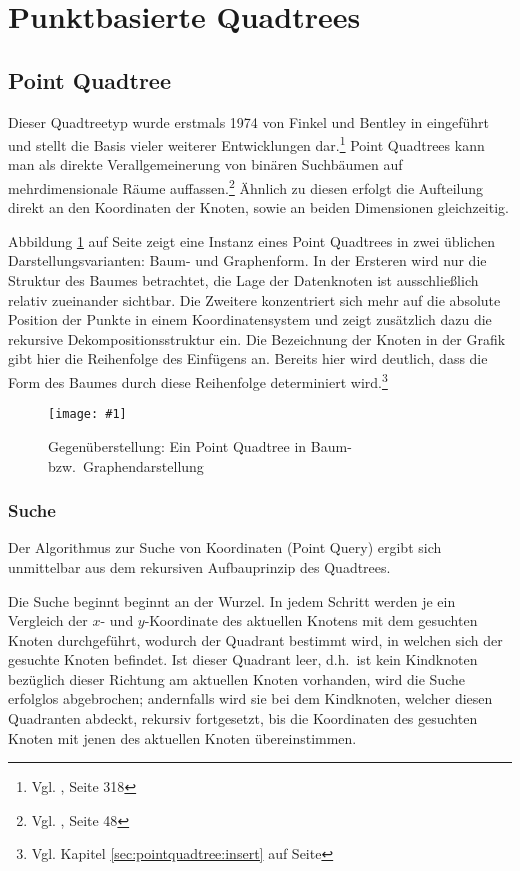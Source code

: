 \documentclass[%
			paper=a4,%
			DIV12,
			liststotoc,
			bibtotoc,
			draft=false,%
			titlepage
			]{scrartcl}
\newcommand{\zit}[3]{#1 \cite{#2}, #3}
\newcommand{\footzit}[3]{\footnote{\zit{#1}{#2}{#3}}}
\newcommand{\myfig}[5] {
 \begin{figure}[tbph]
	 \centering
	 \texttt{[image: \#1]}
	 \caption[#4]{#5}
	 \label{fig:#2}
 \end{figure}
}
\begin{document}
\section{Punktbasierte Quadtrees}
\label{sec:pointbased}
\subsection{Point Quadtree}
Dieser Quadtreetyp wurde erstmals 1974 von Finkel und Bentley in \cite{DBLP:journals/acta/FinkelB74} eingeführt und stellt die Basis vieler weiterer Entwicklungen dar.\footzit{Vgl.}{compgeom:2000}{Seite 318}
Point Quadtrees kann man als direkte Verallgemeinerung von binären Suchbäumen auf mehrdimensionale Räume auffassen.\footzit{Vgl.}{Samet90}{Seite 48}
Ähnlich zu diesen erfolgt die Aufteilung direkt an den Koordinaten der Knoten, sowie an beiden Dimensionen gleichzeitig. 


Abbildung \ref{fig:pointquadtree} auf Seite \pageref{fig:pointquadtree} zeigt eine Instanz eines Point Quadtrees in zwei üblichen Darstellungsvarianten: Baum- und Graphenform.
In der Ersteren wird nur die Struktur des Baumes betrachtet, die Lage der Datenknoten ist ausschließlich relativ zueinander sichtbar.
Die Zweitere konzentriert sich mehr auf die absolute Position der Punkte in einem Koordinatensystem und zeigt zusätzlich dazu die rekursive Dekompositionsstruktur ein.
Die Bezeichnung der Knoten in der Grafik gibt hier die Reihenfolge des Einfügens an. Bereits hier wird deutlich, dass die Form des Baumes durch diese Reihenfolge determiniert wird.\footnote{Vgl. Kapitel \ref{sec:pointquadtree:insert} auf Seite \pageref{sec:pointquadtree:insert}}
\myfig{img/pointquadtree-ins7+tree-trimmed}{pointquadtree}{width=.9\textwidth}{Point Quadtree}{Gegenüberstellung: Ein Point Quadtree in Baum- bzw.\ Graphendarstellung}

\subsubsection{Suche}
\label{sec:pointquadtree-suche}
Der Algorithmus zur Suche von Koordinaten (Point Query) ergibt sich unmittelbar aus dem rekursiven Aufbauprinzip des Quadtrees. 

Die Suche beginnt beginnt an der Wurzel. In jedem Schritt werden je ein Vergleich der $x$- und $y$-Koordinate des aktuellen Knotens mit dem gesuchten Knoten durchgeführt, wodurch der Quadrant bestimmt wird, in welchen sich der gesuchte Knoten befindet. Ist dieser Quadrant leer, d.h.\ ist kein Kindknoten bezüglich dieser Richtung am aktuellen Knoten vorhanden, wird die Suche erfolglos abgebrochen; andernfalls wird sie bei dem Kindknoten, welcher diesen Quadranten abdeckt, rekursiv fortgesetzt, bis die Koordinaten des gesuchten Knoten mit jenen des aktuellen Knoten übereinstimmen.
\end{document}
